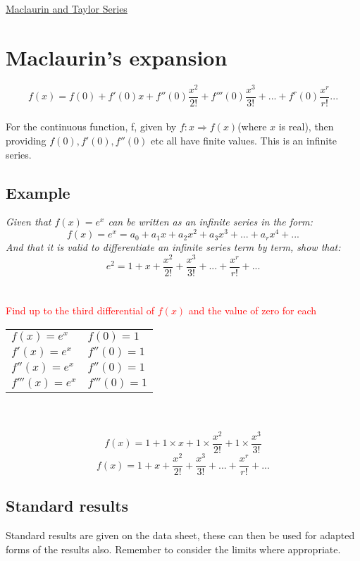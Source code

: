 \documentclass{article}[18pt]
\begin{document}
\begin{center}
\underline{\huge Maclaurin and Taylor Series}
\end{center}
\section{Maclaurin's expansion}
$$f(x)=f(0)+f'(0)x+f''(0)\frac{x^2}{2!}+f'''(0)\frac{x^3}{3!}+...+f^r(0)\frac{x^r}{r!}...$$
\\
For the continuous function, f, given by $f:x\Rightarrow f(x)$(where $x$ is real), then providing $f(0),f'(0),f''(0)$ etc all have finite values. This is an infinite series.
\subsection{Example}
\textit{Given that $f(x)=e^x$ can be written as an infinite series in the form:}
$$f(x)=e^x=a_0+a_1x+a_2x^2+a_3x^3+...+a_rx^4+...$$
\textit{And that it is valid to differentiate an infinite series term by term, show that:}
$$e^2=1+x+\frac{x^2}{2!}+\frac{x^3}{3!}+...+\frac{x^r}{r!}+...$$
\\
\\
\textcolor{red}{Find up to the third differential of $f(x)$ and the value of zero for each}\\
\begin{tabular}{l l}
$f(x)=e^x$&$f(0)=1$\\
$f'(x)=e^x$&$f''(0)=1$\\
$f''(x)=e^x$&$f''(0)=1$\\
$f'''(x)=e^x$&$f'''(0)=1$
\end{tabular}
\\
\\
$$f(x)=1+1\times x+1\times\frac{x^2}{2!}+1\times\frac{x^3}{3!}$$
$$f(x)=1+x+\frac{x^2}{2!}+\frac{x^3}{3!}+...+\frac{x^r}{r!}+...$$
\subsection{Standard results}
Standard results are given on the data sheet, these can then be used for adapted forms of the results also. Remember to consider the limits where appropriate.
\end{document}
